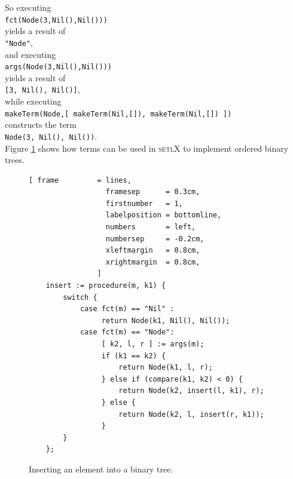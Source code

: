 \documentclass[11pt]{report}
\begin{document}
So executing 
\\[0.2cm]
\hspace*{0.6cm}
\texttt{fct(Node(3,Nil(),Nil()))} 
\\
yields a result of 
\\[0.2cm]
\hspace*{0.6cm}
\texttt{"Node"},
\\
and executing 
\\[0.2cm]
\hspace*{0.6cm}
\texttt{args(Node(3,Nil(),Nil()))} 
\\
yields a result of 
\\[0.2cm]
\hspace*{0.6cm}
\texttt{[3, Nil(), Nil()]},
\\
while executing 
\\[0.2cm]
\hspace*{0.6cm}
\texttt{makeTerm(Node,[ makeTerm(Nil,[]), makeTerm(Nil,[]) ])} 
\\
constructs the term 
\\[0.2cm]
\hspace*{0.6cm}
\texttt{Node(3, Nil(), Nil())}.
\\[0.4cm]
Figure \ref{fig:binary-tree-no-matching.stlx} shows how terms can be used in \textsc{setlX} to implement ordered binary trees.
\pagebreak
\begin{figure}[!ht]
\centering
\begin{Verbatim}[ frame         = lines, 
                  framesep      = 0.3cm, 
                  firstnumber   = 1,
                  labelposition = bottomline,
                  numbers       = left,
                  numbersep     = -0.2cm,
                  xleftmargin   = 0.8cm,
                  xrightmargin  = 0.8cm,
                ]
    insert := procedure(m, k1) {
        switch {
            case fct(m) == "Nil" : 
                 return Node(k1, Nil(), Nil());
            case fct(m) == "Node": 
                 [ k2, l, r ] := args(m);
                 if (k1 == k2) {
                     return Node(k1, l, r);
                 } else if (compare(k1, k2) < 0) { 
                     return Node(k2, insert(l, k1), r);
                 } else {
                     return Node(k2, l, insert(r, k1));
                 }
        }
    };
\end{Verbatim}
\vspace*{-0.3cm}
\caption{Inserting an element into a binary tree.}
\label{fig:binary-tree-no-matching.stlx}
\end{figure}
\end{document}
